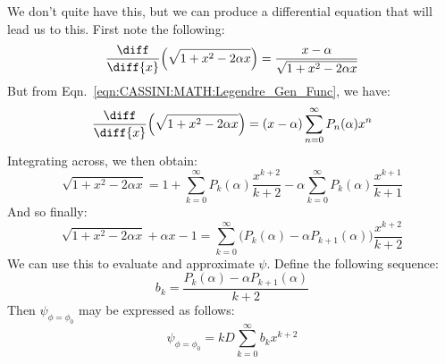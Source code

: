\documentclass[crop=false,class=book,oneside]{standalone}
\begin{document}
            We don't quite have this, but we can
            produce a differential equation that
            will lead us to this. First note
            the following:
            \begin{equation}
                \frac{\diff}{\diff{x}}
                \Big(\sqrt{1+x^{2}-2\alpha{x}}\Big)
                =\frac{x-\alpha}{\sqrt{1+x^{2}-2\alpha{x}}}
            \end{equation}
            But from
            Eqn.~\ref{eqn:CASSINI:MATH:Legendre_Gen_Func}, we
            have:
            \begin{equation}
                \frac{\diff}{\diff{x}}
                \Big(\sqrt{1+x^{2}-2\alpha{x}}\Big)
                =(x-\alpha)
                \sum_{n=0}^{\infty}P_{n}(\alpha)x^{n}
            \end{equation}
            Integrating across, we then obtain:
            \begin{equation}
                \sqrt{1+x^{2}-2\alpha{x}}
                =1+\sum_{k=0}^{\infty}P_{k}(\alpha)
                \frac{x^{k+2}}{k+2}
                -\alpha\sum_{k=0}^{\infty}P_{k}(\alpha)
                \frac{x^{k+1}}{k+1}
            \end{equation}
            And so finally:
            \begin{equation}
                \sqrt{1+x^{2}-2\alpha{x}}+\alpha{x}-1
                =\sum_{k=0}^{\infty}
                \Big(P_{k}(\alpha)-
                     \alpha{P_{k+1}}(\alpha)\Big)
                \frac{x^{k+2}}{k+2}
            \end{equation}
            We can use this to evaluate and
            approximate $\psi$.
            Define the following sequence:
            \begin{equation}
                b_{k}=
                \frac{P_{k}(\alpha)-\alpha{P_{k+1}}(\alpha)}
                     {k+2}
            \end{equation}
            Then $\psi_{\phi=\phi_{0}}$ may be expressed
            as follows:
            \begin{equation}
                \psi_{\phi=\phi_{0}}=
                kD\sum_{k=0}^{\infty}b_{k}x^{k+2}
            \end{equation}
\end{document}
